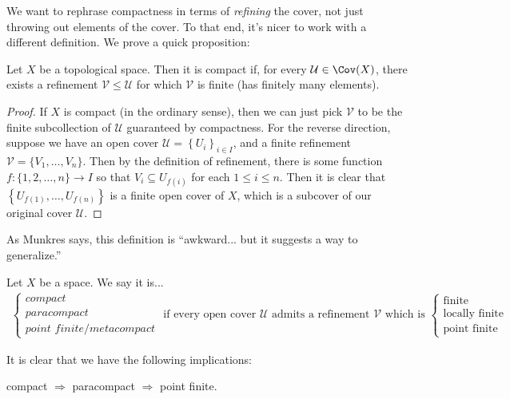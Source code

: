 \documentclass[11pt]{amsart}
\begin{document}
We want to rephrase compactness in terms of \emph{refining} the cover, not just throwing out elements of the cover. To that end, it's nicer to work with a different definition. We prove a quick proposition:

\begin{proposition}\label{prop:new-def-of-compactness} Let $X$ be a topological space. Then it is compact if, for every $\mathcal{U}\in \Cov(X)$, there exists a refinement $\mathcal{V} \le \mathcal{U}$ for which $\mathcal{V}$ is finite (has finitely many elements).
\end{proposition}
\begin{proof} If $X$ is compact (in the ordinary sense), then we can just pick $\mathcal{V}$ to be the finite subcollection of $\mathcal{U}$ guaranteed by compactness. For the reverse direction, suppose we have an open cover $\mathcal{U} = \left\{ U_i \right\}_{i\in I}$, and a finite refinement $\mathcal{V} =\{V_1, \ldots, V_n\}$. Then by the definition of refinement, there is some function $f \colon \{1,2, \ldots, n\} \to I$ so that $V_i \subseteq U_{f(i)}$ for each $1\le i\le n$. Then it is clear that $\left\{ U_{f(1)}, \ldots, U_{f(n)} \right\}$ is a finite open cover of $X$, which is a subcover of our original cover $\mathcal{U}$.
\end{proof}

As Munkres says, this definition is ``awkward... but it suggests a way to generalize.''

\begin{definition}\label{def:compact-paracompact-point-finite} Let $X$ be a space. We say it is...
\begin{align*}
    \begin{cases} \textit{compact} \\ \textit{paracompact} \\ \textit{point finite/metacompact}\end{cases}\text{ if every open cover }\mathcal{U}\text{ admits a refinement }\mathcal{V}\text{ which is }
    \begin{cases} \text{finite} \\ \text{locally finite} \\ \text{point finite}\end{cases}
\end{align*}
\end{definition}
It is clear that we have the following implications:
\begin{center}
    compact $\Rightarrow$ paracompact $\Rightarrow$ point finite.
\end{center}
\end{document}
